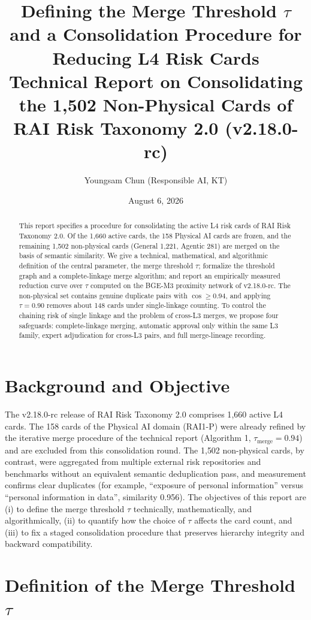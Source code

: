 \documentclass[11pt,a4paper]{article}
\title{\textbf{Defining the Merge Threshold $\tau$ and a Consolidation Procedure for Reducing L4 Risk Cards}\\[4pt]
\large Technical Report on Consolidating the 1{,}502 Non-Physical Cards of RAI Risk Taxonomy 2.0 (v2.18.0-rc)}
\author{Youngsam Chun (Responsible AI, KT)}
\date{August 6, 2026}
\begin{document}
\maketitle

\begin{abstract}
This report specifies a procedure for consolidating the active L4 risk cards of RAI Risk Taxonomy 2.0. Of the 1{,}660 active cards, the 158 Physical AI cards are frozen, and the remaining 1{,}502 non-physical cards (General 1{,}221, Agentic 281) are merged on the basis of semantic similarity. We give a technical, mathematical, and algorithmic definition of the central parameter, the merge threshold $\tau$; formalize the threshold graph and a complete-linkage merge algorithm; and report an empirically measured reduction curve over $\tau$ computed on the BGE-M3 proximity network of v2.18.0-rc. The non-physical set contains genuine duplicate pairs with $\cos \geq 0.94$, and applying $\tau = 0.90$ removes about 148 cards under single-linkage counting. To control the chaining risk of single linkage and the problem of cross-L3 merges, we propose four safeguards: complete-linkage merging, automatic approval only within the same L3 family, expert adjudication for cross-L3 pairs, and full merge-lineage recording.
\end{abstract}

\section{Background and Objective}

The v2.18.0-rc release of RAI Risk Taxonomy 2.0 comprises 1{,}660 active L4 cards. The 158 cards of the Physical AI domain (RAI1-P) were already refined by the iterative merge procedure of the technical report (Algorithm 1, $\tau_{\mathrm{merge}}=0.94$) and are excluded from this consolidation round. The 1{,}502 non-physical cards, by contrast, were aggregated from multiple external risk repositories and benchmarks without an equivalent semantic deduplication pass, and measurement confirms clear duplicates (for example, ``exposure of personal information'' versus ``personal information in data'', similarity 0.956). The objectives of this report are (i) to define the merge threshold $\tau$ technically, mathematically, and algorithmically, (ii) to quantify how the choice of $\tau$ affects the card count, and (iii) to fix a staged consolidation procedure that preserves hierarchy integrity and backward compatibility.

\section{Definition of the Merge Threshold $\tau$}
\end{document}
